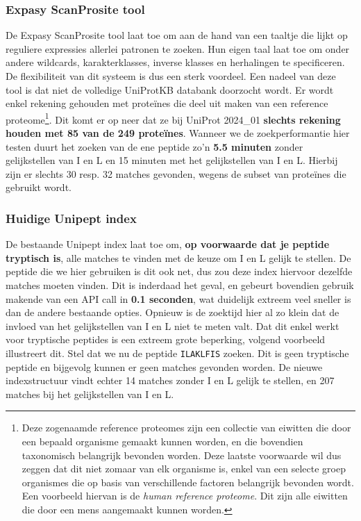 \subsubsection{Expasy ScanProsite tool}
De Expasy ScanProsite tool\cite{scanprosite} laat toe om aan de hand van een taaltje die lijkt op reguliere expressies allerlei patronen te zoeken.
Hun eigen taal laat toe om onder andere wildcards, karakterklasses, inverse klasses en herhalingen te specificeren.
De flexibiliteit van dit systeem is dus een sterk voordeel.
Een nadeel van deze tool is dat niet de volledige UniProtKB databank doorzocht wordt.
Er wordt enkel rekening gehouden met proteïnes die deel uit maken van een reference proteome\footnote{Deze zogenaamde reference proteomes zijn een collectie van eiwitten die door een bepaald organisme gemaakt kunnen worden, en die bovendien taxonomisch belangrijk bevonden worden. Deze laatste voorwaarde wil dus zeggen dat dit niet zomaar van elk organisme is, enkel van een selecte groep organismes die op basis van verschillende factoren belangrijk bevonden wordt. Een voorbeeld hiervan is de \textit{human reference proteome}. Dit zijn alle eiwitten die door een mens aangemaakt kunnen worden.}.
Dit komt er op neer dat ze bij UniProt 2024\_01 \textbf{slechts rekening houden met 85 van de 249 proteïnes}.
Wanneer we de zoekperformantie hier testen duurt het zoeken van de ene peptide zo'n \textbf{5.5 minuten} zonder gelijkstellen van I en L en 15 minuten met het gelijkstellen van I en L\@.
Hierbij zijn er slechts 30 resp. 32 matches gevonden, wegens de subset van proteïnes die gebruikt wordt.

\subsubsection{Huidige Unipept index}
De bestaande Unipept index laat toe om, \textbf{op voorwaarde dat je peptide tryptisch is}, alle matches te vinden met de keuze om I en L gelijk te stellen.
De peptide die we hier gebruiken is dit ook net, dus zou deze index hiervoor dezelfde matches moeten vinden.
Dit is inderdaad het geval, en gebeurt bovendien gebruik makende van een API call in \textbf{0.1 seconden}, wat duidelijk extreem veel sneller is dan de andere bestaande opties.
Opnieuw is de zoektijd hier al zo klein dat de invloed van het gelijkstellen van I en L niet te meten valt.
Dat dit enkel werkt voor tryptische peptides is een extreem grote beperking, volgend voorbeeld illustreert dit.
Stel dat we nu de peptide \texttt{ILAKLFIS} zoeken.
Dit is geen tryptische peptide en bijgevolg kunnen er geen matches gevonden worden.
De nieuwe indexstructuur vindt echter 14 matches zonder I en L gelijk te stellen, en 207 matches bij het gelijkstellen van I en L.

